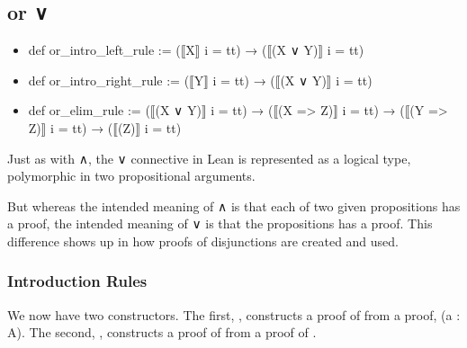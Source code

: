 \documentclass[letterpaper,10pt,english]{sphinxmanual}
\begin{document}
\subsection{or ∨}
\label{\detokenize{A_02_Constructive_Logic:or}}\begin{itemize}
\item {} 
\sphinxAtStartPar
def or\_intro\_left\_rule := (⟦X⟧ i = tt) → (⟦(X ∨ Y)⟧ i = tt)

\item {} 
\sphinxAtStartPar
def or\_intro\_right\_rule := (⟦Y⟧ i = tt) → (⟦(X ∨ Y)⟧ i = tt)

\item {} 
\sphinxAtStartPar
def or\_elim\_rule :=   (⟦(X ∨ Y)⟧ i = tt) → (⟦(X => Z)⟧ i = tt) → (⟦(Y => Z)⟧ i = tt) → (⟦(Z)⟧ i = tt)

\end{itemize}

\sphinxAtStartPar
Just as with ∧, the ∨ connective in Lean is represented as
a logical type, polymorphic in two propositional arguments.

\begin{sphinxVerbatim}[commandchars=\\\{\}]
       
      
      
 
\end{sphinxVerbatim}

\sphinxAtStartPar
But whereas the intended meaning of ∧ is that each of two
given propositions has a proof, the intended meaning of ∨
is that  the propositions has a proof. This
difference shows up in how proofs of disjunctions are created
and used.


\subsubsection{Introduction Rules}
\label{\detokenize{A_02_Constructive_Logic:introduction-rules}}
\sphinxAtStartPar
We now have two constructors. The first, , constructs
a proof of  from a proof, (a : A). The second, ,
constructs a proof of  from a proof of .
\end{document}
